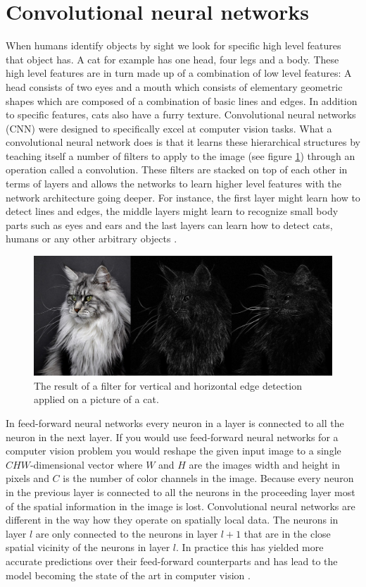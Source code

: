 \documentclass[a4paper, twoside]{article}
\begin{document}
\section{Convolutional neural networks}
When humans identify objects by sight we look for specific high level features that object has. A cat for example has one head, four legs and a body. These high level features are in turn made up of a combination of low level features: A head consists of two eyes and a mouth which consists of elementary geometric shapes which are composed of a combination of basic lines and edges. In addition to specific features, cats also have a furry texture. Convolutional neural networks (CNN) were designed to specifically excel at computer vision tasks. What a convolutional neural network does is that it learns these hierarchical structures by teaching itself a number of filters to apply to the image (see figure \ref{figkatter}) through an operation called a convolution. These filters are stacked on top of each other in terms of layers and allows the networks to learn higher level features with the network architecture going deeper. For instance, the first layer might learn how to detect lines and edges, the middle layers might learn to recognize small body parts such as eyes and ears and the last layers can learn how to detect cats, humans or any other arbitrary objects \cite{cs231n}.

\begin{figure}[h]
	\centering
  		\includegraphics[scale=0.33]{katter.png}
  	\caption{The result of a filter for vertical and horizontal edge detection applied on a picture of a cat.} \label{figkatter}
\end{figure}

In feed-forward neural networks every neuron in a layer is connected to all the neuron in the next layer. If you would use feed-forward neural networks for a computer vision problem you would reshape the given input image to a single $CHW$-dimensional vector where $W$ and $H$ are the images width and height in pixels and $C$ is the number of color channels in the image. Because every neuron in the previous layer is connected to all the neurons in the proceeding layer most of the spatial information in the image is lost. Convolutional neural networks are different in the way how they operate on spatially local data. The neurons in layer $l$ are only connected to the neurons in layer $l+1$ that are in the close spatial vicinity of the neurons in layer $l$. In practice this has yielded more accurate predictions over their feed-forward counterparts and has lead to the model becoming the state of the art in computer vision \cite{cs231n} \cite{convmath} \cite{convarithmetic}.
\end{document}
